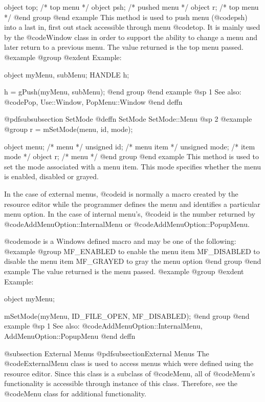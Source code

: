 object  top;    /*  top menu     */
object  psh;    /*  pushed menu  */
object  r;      /*  top menu     */
@end group
@end example
This method is used to push menu (@code{psh}) into a last in, first out
stack accessible through menu @code{top}.  It is mainly used by the
@code{Window} class in order to support the ability to change a menu and
later return to a previous menu.  The value returned is the top menu
passed.
@example
@group
@exdent Example:

object  myMenu, subMenu;
HANDLE  h;

h = gPush(myMenu, subMenu);
@end group
@end example
@sp 1
See also:  @code{Pop, Use::Window, PopMenu::Window}
@end deffn








@pdfsubsubsection {SetMode}
@deffn {SetMode} SetMode::Menu
@sp 2
@example
@group
r = mSetMode(menu, id, mode);

object  menu;   /*  menu       */
unsigned  id;   /*  menu item  */
unsigned  mode; /*  item mode  */
object    r;    /*  menu       */
@end group
@end example
This method is used to set the mode associated with a menu item.  This
mode specifies whether the menu is enabled, disabled or grayed.

In the case of external menus, @code{id} is normally a macro created by
the resource editor while the programmer defines the menu and identifies
a particular menu option.  In the case of internal menu's, @code{id}
is the number returned by @code{AddMenuOption::InternalMenu} or
@code{AddMenuOption::PopupMenu}.

@code{mode} is a Windows defined macro and may be one of the following:
@example
@group
MF_ENABLED      to enable the menu item
MF_DISABLED     to disable the menu item
MF_GRAYED       to gray the menu option
@end group
@end example
The value returned is the menu passed.
@example
@group
@exdent Example:

object  myMenu;

mSetMode(myMenu, ID_FILE_OPEN, MF_DISABLED);
@end group
@end example
@sp 1
See also:  @code{AddMenuOption::InternalMenu, AddMenuOption::PopupMenu}
@end deffn






@subsection External Menus
@pdfsubsection{External Menus}
The @code{ExternalMenu} class is used to access menus which were defined
using the resource editor.  Since this class is a subclass of @code{Menu},
all of @code{Menu}'s functionality is accessible through instance of this
class.  Therefore, see the @code{Menu} class for additional functionality.







